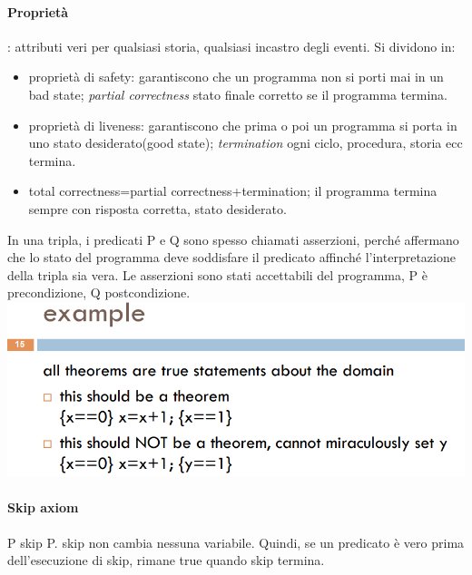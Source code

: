 \documentclass[10pt,a4paper]{book}
\begin{document}
\paragraph{Proprietà}: attributi veri per qualsiasi storia, qualsiasi incastro degli eventi.
Si dividono in:
\begin{itemize}
\item proprietà di safety: garantiscono che un programma non si porti mai in un bad state; \textit{partial correctness} stato finale corretto se il programma termina.
\item proprietà di liveness: garantiscono che prima o poi un programma si porta in uno stato desiderato(good state); \textit{termination} ogni ciclo, procedura, storia ecc termina.
\item total correctness=partial correctness+termination; il programma termina sempre con risposta corretta, stato desiderato.
\end{itemize} 

In una tripla, i predicati P e Q sono spesso chiamati asserzioni, perché affermano che lo stato del programma deve soddisfare il predicato affinché l'interpretazione della tripla sia vera.
Le asserzioni sono stati accettabili del programma, P è precondizione, Q postcondizione.\\
\includegraphics[scale=0.45]{img/theorem.png} \\

\paragraph{Skip axiom} {P} skip {P}.
skip non cambia nessuna variabile. Quindi, se un predicato è vero prima dell'esecuzione di skip, rimane
true quando skip termina.
\end{document}
